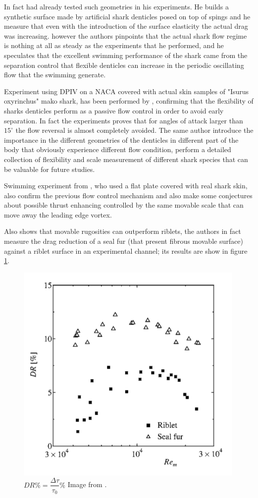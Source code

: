 In fact \citet{bechert1997natural} had already tested such geometries in his experiments. 
He builds a synthetic surface made by artificial shark denticles posed on top of spings and he measure that even with the introduction of the surface elasticity the actual drag was increasing.
however the authors pinpoints that the actual shark flow regime is nothing at all as steady as the experiments that he performed, and he speculates that the excellent swimming performance of the shark came from the separation control that flexible denticles can increase in the periodic oscillating flow that the swimming generate.

Experiment using DPIV on a NACA covered with actual skin samples of "Isurus oxyrinchus" mako shark, has been performed by \citet{lang2014SharkControl}, confirming that the flexibility of sharks denticles perform as a passive flow control in order to avoid early separation.
In fact the experiments proves that for angles of attack larger than $15^{\circ}$ the flow reversal is almost completely avoided.
The same author introduce the importance in the different geometries of the denticles in different part of the body that obviously experience different flow condition,
\citet{motta2012Shark} perform a detailed collection of flexibility and scale measurement of different shark species that can be valuable for future studies.

Swimming experiment from \cite{Oeffner785}, who used a flat plate covered with real shark skin, also confirm the previous flow control mechanism and also make some conjectures about possible thrust enhancing controlled by the same movable scale that can move away the leading edge vortex.

Also \citet{itoh2006turbulent} shows that movable rugosities can outperform riblets, the authors in fact measure the drag reduction of a seal fur (that present fibrous movable surface) against a riblet surface in an experimental channel; its results are show in figure \ref{fig:seal}.

\begin{figure}[h]
\centering
\includegraphics[width=0.5\linewidth]{chapter_1/seal}
\caption{$DR \% = \dfrac{ \Delta \tau}{\tau_{0}} \%$ Image from \citet{itoh2006turbulent}.}
\label{fig:seal}
\end{figure}


